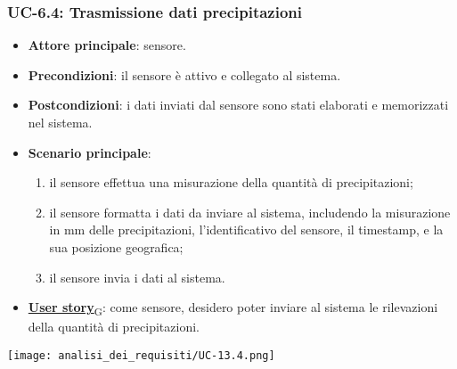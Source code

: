 \subsubsection{UC-6.4: Trasmissione dati precipitazioni}
\begin{itemize}
	\item \textbf{Attore principale}: sensore.
	\item \textbf{Precondizioni}: il sensore è attivo e collegato al sistema.
	\item \textbf{Postcondizioni}: i dati inviati dal sensore sono stati elaborati e memorizzati nel sistema.
	\item \textbf{Scenario principale}:
	      \begin{enumerate}
		      \item il sensore effettua una misurazione della quantità di precipitazioni;
		      \item il sensore formatta i dati da inviare al sistema, includendo la misurazione in mm delle precipitazioni, l'identificativo del sensore,
		            il timestamp, e la sua posizione geografica;
		      \item il sensore invia i dati al sistema.
	      \end{enumerate}
	\item \href{https://7last.github.io/docs/rtb/documentazione-interna/glossario\#user-story}{\textbf{User story}\textsubscript{G}}: come sensore, desidero poter inviare al sistema le rilevazioni della quantità di precipitazioni.
\end{itemize}

\begin{center}
	\texttt{[image: analisi\_dei\_requisiti/UC-13.4.png]}
\end{center}
